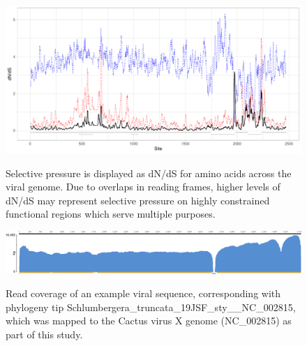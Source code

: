 \documentclass[fleqn,10pt,lineno]{wlpeerj}
\begin{document}
\begin{figure}
\centering
\caption{
Selective pressure is displayed as dN/dS for amino acids across the viral genome. Due to overlaps in reading frames, higher levels of dN/dS may represent selective pressure on highly constrained functional regions which serve multiple purposes.
}
\includegraphics[width=1\textwidth]{supplementaryinfo/selectionplot.pdf}
\label{fig:selectionplot}
\end{figure}
\clearpage


\begin{figure}
\centering
\caption{
Read coverage of an example viral sequence, corresponding with phylogeny tip Schlumbergera\_truncata\_19JSF\_sty\_\_NC\_002815, which was mapped to the Cactus virus X genome (NC\_002815) as part of this study.
}
\includegraphics[width=1\textwidth]{figures/CVX-NC_002815-coverage-graph.pdf}	
\label{fig:coverage}
\end{figure}
\clearpage
\end{document}

